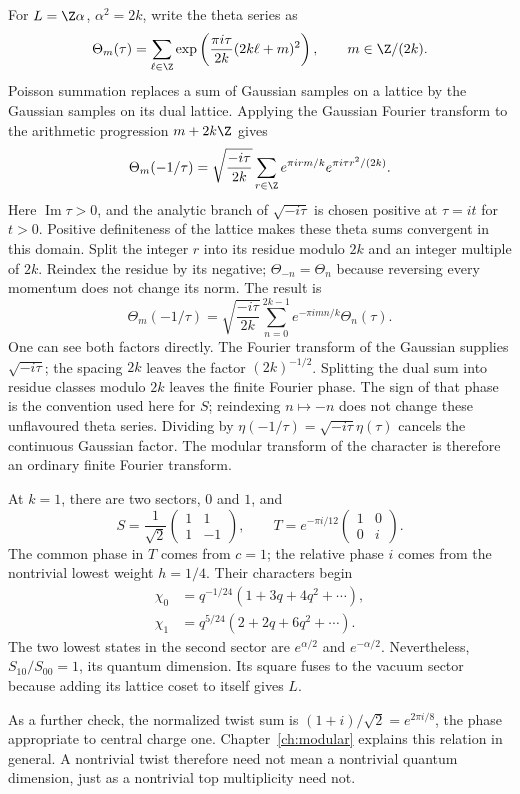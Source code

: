 \begin{example}
\label{ex:voa-poisson}
For $L=\Z\alpha$, $\alpha^2=2k$, write the theta series as
\[
 \Theta_m(\tau)=\sum_{\ell\in\Z}
 \exp\left(\frac{\pi i\tau}{2k}(2k\ell+m)^2\right),
 \qquad m\in\Z/(2k).
\]
Poisson summation replaces a sum of Gaussian samples on a lattice
by the Gaussian samples on its dual lattice. Applying the Gaussian
Fourier transform to the arithmetic progression $m+2k\Z$ gives
\[
 \Theta_m(-1/\tau)=\sqrt{\frac{-i\tau}{2k}}
 \sum_{r\in\Z}e^{\pi i rm/k}e^{\pi i\tau r^2/(2k)}.
\]
Here $\operatorname{Im}\tau>0$, and the analytic branch of
$\sqrt{-i\tau}$ is chosen positive at $\tau=it$ for $t>0$.
Positive definiteness of the lattice makes these theta sums
convergent in this domain.
Split the integer $r$ into its residue modulo $2k$ and an
integer multiple of $2k$. Reindex the residue by its negative;
$\Theta_{-n}=\Theta_n$ because reversing every momentum does
not change its norm. The result is
\begin{equation}
 \Theta_m(-1/\tau)=
 \sqrt{\frac{-i\tau}{2k}}
 \sum_{n=0}^{2k-1}e^{-\pi i mn/k}\Theta_n(\tau).
 \label{eq:voa-rankone-poisson}
\end{equation}
One can see both factors directly. The Fourier transform of the
Gaussian supplies $\sqrt{-i\tau}$; the spacing $2k$ leaves the
factor $(2k)^{-1/2}$. Splitting the dual sum into residue classes
modulo $2k$ leaves the finite Fourier phase. The sign of that phase
is the convention used here for $S$; reindexing $n\mapsto-n$
does not change these unflavoured theta series. Dividing by
$\eta(-1/\tau)=\sqrt{-i\tau}\eta(\tau)$ cancels the
continuous Gaussian factor. The modular transform of the character
is therefore an ordinary finite Fourier transform.

At $k=1$, there are two sectors, $0$ and $1$, and
\[
 S=\frac1{\sqrt2}\begin{pmatrix}1&1\\1&-1\end{pmatrix},
 \qquad
 T=e^{-\pi i/12}\begin{pmatrix}1&0\\0&i\end{pmatrix}.
\]
The common phase in $T$ comes from $c=1$; the relative phase
$i$ comes from the nontrivial lowest weight $h=1/4$.
Their characters begin
\begin{align*}
 \chi_0&=q^{-1/24}(1+3q+4q^2+\cdots),\\
 \chi_1&=q^{5/24}(2+2q+6q^2+\cdots).
\end{align*}
The two lowest states in the second sector are
$e^{\alpha/2}$ and $e^{-\alpha/2}$. Nevertheless,
$S_{10}/S_{00}=1$, its quantum dimension. Its square fuses to
the vacuum sector because adding its lattice coset to itself
gives $L$.

As a further check, the normalized twist sum is
$(1+i)/\sqrt2=e^{2\pi i/8}$, the phase appropriate to central
charge one. Chapter~\ref{ch:modular} explains this relation in
general. A nontrivial twist therefore need not mean a nontrivial
quantum dimension, just as a nontrivial top multiplicity need not.
\end{example}

